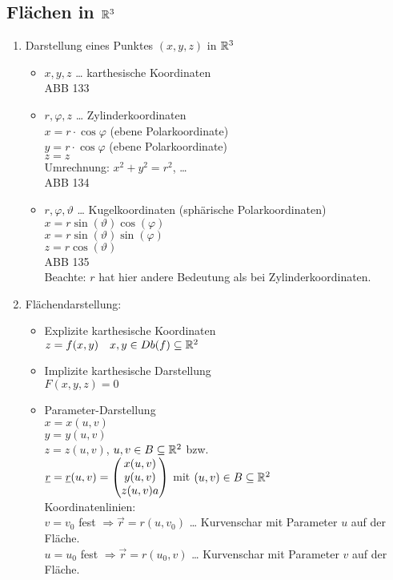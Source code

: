 \subsection{Flächen in \texorpdfstring{$\mathbb{R}^3$}{}}
\begin{enumerate}
\item Darstellung eines Punktes $(x,y,z)$ in $\mathbb{R}^3$
\begin{itemize}
\item $x,y,z$ … karthesische Koordinaten\\
ABB 133
\item $r, \varphi, z$ … Zylinderkoordinaten\\
$x=r\cdot \cos \varphi$ (ebene Polarkoordinate)\\
$y= r \cdot \cos \varphi$ (ebene Polarkoordinate)\\
$z=z$\\
Umrechnung: $x^2+y^2=r^2$, …\\
ABB 134
\item $r, \varphi, \vartheta$ … Kugelkoordinaten (sphärische Polarkoordinaten)\\
$x=r\sin(\vartheta) \cos (\varphi)$\\
$x=r\sin(\vartheta) \sin(\varphi)$\\
$z=r\cos (\vartheta)$\\
ABB 135\\
Beachte: $r$ hat hier andere Bedeutung als bei Zylinderkoordinaten.
\end{itemize}
\item Flächendarstellung:
\begin{itemize}
\item Explizite karthesische Koordinaten\\
$z=f(x,y) \quad x,y \in Db(f) \subseteq \mathbb{R}^2$
\item Implizite karthesische Darstellung\\
$F(x,y,z) = 0$
\item Parameter-Darstellung\\
$x=x(u,v)$\\
$y=y(u,v)$\\
$z=z(u,v)$, \quad $u,v \in B\subseteq \mathbb{R}^2$ bzw.\\
$\underline{r}=\underline{r}(u,v) = \begin{pmatrix}x(u,v)\\ y(u,v)\\ z(u,v)a\end{pmatrix}$ \quad mit $(u,v) \in B \subseteq \mathbb{R}^2$\\
Koordinatenlinien: \\
$v=v_0$ fest $\Rightarrow \vec{r}=r(u,v_0)$ … Kurvenschar mit Parameter $u$ auf der Fläche.\\
$u=u_0$ fest $\Rightarrow \vec{r}=r(u_0, v)$ … Kurvenschar mit Parameter $v$ auf der Fläche.
\end{itemize}
\end{enumerate}







